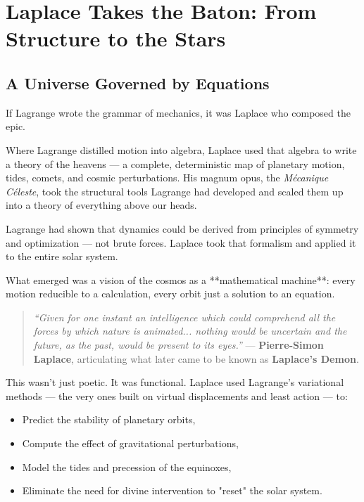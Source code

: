 \section{Laplace Takes the Baton: From Structure to the Stars}


\subsection{A Universe Governed by Equations}

If Lagrange wrote the grammar of mechanics, it was Laplace who composed the epic.

Where Lagrange distilled motion into algebra, Laplace used that algebra to write a theory of the heavens — a complete, deterministic map of planetary motion, tides, comets, and cosmic perturbations. His magnum opus, the \textit{Mécanique Céleste}, took the structural tools Lagrange had developed and scaled them up into a theory of everything above our heads.

Lagrange had shown that dynamics could be derived from principles of symmetry and optimization — not brute forces. Laplace took that formalism and applied it to the entire solar system.

What emerged was a vision of the cosmos as a **mathematical machine**: every motion reducible to a calculation, every orbit just a solution to an equation.

\begin{quote}
\textit{“Given for one instant an intelligence which could comprehend all the forces by which nature is animated... nothing would be uncertain and the future, as the past, would be present to its eyes.”}  
— \textbf{Pierre-Simon Laplace}, articulating what later came to be known as \textbf{Laplace’s Demon}.
\end{quote}

This wasn’t just poetic. It was functional. Laplace used Lagrange’s variational methods — the very ones built on virtual displacements and least action — to:
\begin{itemize}
    \item Predict the stability of planetary orbits,
    \item Compute the effect of gravitational perturbations,
    \item Model the tides and precession of the equinoxes,
    \item Eliminate the need for divine intervention to "reset" the solar system.
\end{itemize}

